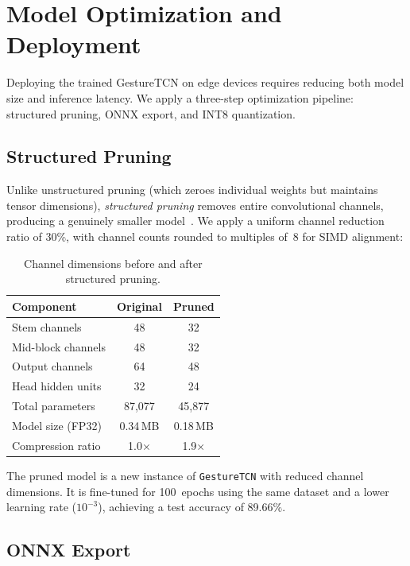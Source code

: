 \section{Model Optimization and Deployment}
\label{sec:deployment}

Deploying the trained GestureTCN on edge devices requires reducing both
model size and inference latency. We apply a three-step optimization
pipeline: structured pruning, ONNX export, and INT8 quantization.

\subsection{Structured Pruning}

Unlike unstructured pruning (which zeroes individual weights but
maintains tensor dimensions), \emph{structured pruning} removes entire
convolutional channels, producing a genuinely smaller
model~\cite{li2017pruning}. We apply a uniform channel reduction ratio
of 30\%, with channel counts rounded to multiples of~8 for SIMD
alignment:

\begin{table}[ht]
\centering
\caption{Channel dimensions before and after structured pruning.}
\label{tab:pruning}
\begin{tabular}{@{}lcc@{}}
\toprule
\textbf{Component} & \textbf{Original} & \textbf{Pruned} \\
\midrule
Stem channels & 48 & 32 \\
Mid-block channels & 48 & 32 \\
Output channels & 64 & 48 \\
Head hidden units & 32 & 24 \\
\midrule
Total parameters & 87,077 & 45,877 \\
Model size (FP32) & 0.34\,MB & 0.18\,MB \\
Compression ratio & 1.0$\times$ & 1.9$\times$ \\
\bottomrule
\end{tabular}
\end{table}

The pruned model is a new instance of \texttt{GestureTCN} with reduced
channel dimensions. It is fine-tuned for 100~epochs using the
same dataset and a lower learning rate ($10^{-3}$), achieving a test
accuracy of 89.66\%.

\subsection{ONNX Export}


